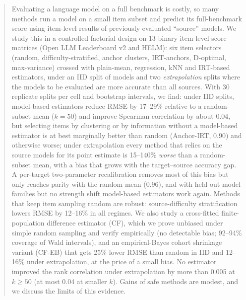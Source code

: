 \begin{abstract}
Evaluating a language model on a full benchmark is costly, so many methods run a model on a small item subset and predict its full-benchmark score using item-level results of previously evaluated ``source'' models. We study this in a controlled factorial design on 13 binary item-level score matrices (Open LLM Leaderboard v2 and HELM): six item selectors (random, difficulty-stratified, anchor clusters, IRT-anchors, D-optimal, max-variance) crossed with plain-mean, regression, kNN and IRT-based estimators, under an IID split of models and two \emph{extrapolation} splits where the models to be evaluated are more accurate than all sources. With 30 replicate splits per cell and bootstrap intervals, we find: under IID splits, model-based estimators reduce RMSE by 17--29\% relative to a random-subset mean ($k{=}50$) and improve Spearman correlation by about 0.04, but selecting items by clustering or by information without a model-based estimator is at best marginally better than random (Anchor-IRT, 0.90) and otherwise worse; under extrapolation every method that relies on the source models for its point estimate is 15--140\% \emph{worse} than a random-subset mean, with a bias that grows with the target--source accuracy gap. A per-target two-parameter recalibration removes most of this bias but only reaches parity with the random mean (0.96), and with held-out model families but no strength shift model-based estimators work again. Methods that keep item sampling random are robust: source-difficulty stratification lowers RMSE by 12--16\% in all regimes. We also study a cross-fitted finite-population difference estimator (CF), which we prove unbiased under simple random sampling and verify empirically (no detectable bias; 92--94\% coverage of Wald intervals), and an empirical-Bayes cohort shrinkage variant (CF-EB) that gets 25\% lower RMSE than random in IID and 12--16\% under extrapolation, at the price of a small bias. No estimator improved the rank correlation under extrapolation by more than 0.005 at $k\ge50$ (at most 0.04 at smaller $k$). Gains of safe methods are modest, and we discuss the limits of this evidence.
\end{abstract}
